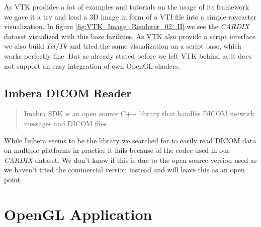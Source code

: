 As VTK prodides a lot of examples and tutorials on the usage of its framework we gave it a try and load a 3D image in form of a VTI file into a simple raycaster visualization. In figure \ref{fig:VTK_Image_Renderer_02_II} we see the \emph{CARDIX} \cite{gimias_sampledata_2018} dataset visualized with this base fazilities. As VTK also provide a script interface we also build $Tcl/Tk$ and tried the same visualization on a script base, which works perfectly fine. But as already stated before we left VTK behind as it does not support an easy integration of own OpenGL shaders.





\subsection{Imbera DICOM Reader}


\blockquote{Imebra SDK is an open source C++ library that handles DICOM network messages and DICOM files \cite{imebra_dicom_sdk_2018}.}

While Imbera seems to be the library we searched for to easily read DICOM data on multiple platforms in practice it fails because of the codec used in our \emph{CARDIX} dataset. We don't know if this is due to the open source version used as we haven't tried the commercial version instead and will leave this as an open point.


\section{OpenGL Application}

